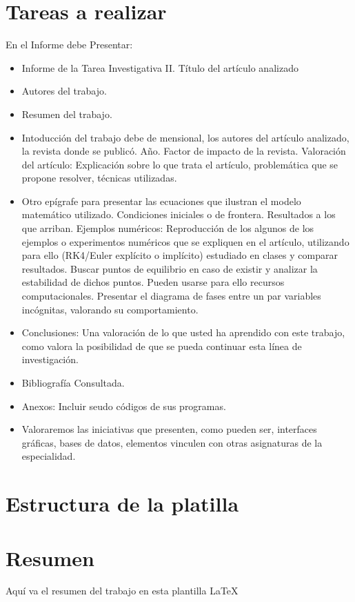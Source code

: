 \documentclass{wscpaperproc}
\theoremstyle{wsc}
\begin{document}
\maketitle
\section*{Tareas a realizar}
En el Informe debe Presentar:
\begin{itemize}
	\item Informe de la Tarea Investigativa II. T\'itulo del art\'iculo analizado
	\item Autores del trabajo.
	\item Resumen del trabajo.
	\item Intoducción del trabajo debe de mensional, los autores del art\'iculo analizado, la revista donde se publicó. A\~no. Factor de impacto de la revista. Valoración del art\'iculo: Explicación sobre lo que trata el art\'iculo, problemática que se propone resolver, t\'ecnicas utilizadas.
	\item Otro ep\'igrafe para presentar las ecuaciones que ilustran el modelo matemático utilizado. Condiciones iniciales o de frontera. Resultados a los que arriban. Ejemplos num\'ericos: Reproducción de los algunos de los ejemplos o experimentos num\'ericos que se expliquen en el art\'iculo, utilizando para ello (RK4/Euler expl\'icito o impl\'icito) estudiado en clases y comparar resultados. Buscar puntos de equilibrio en caso de existir y analizar la estabilidad de dichos puntos. Pueden usarse para ello recursos computacionales. Presentar el diagrama de fases entre un par variables incógnitas, valorando su comportamiento.
	\item Conclusiones: Una valoración de lo que usted ha aprendido con este trabajo, como valora la posibilidad de que se pueda continuar esta l\'inea de investigación.
	\item Bibliograf\'ia Consultada.
	\item  Anexos: Incluir seudo códigos de sus programas.
	\item Valoraremos las iniciativas que presenten, como pueden ser, interfaces gráficas, bases de datos, elementos  vinculen con otras asignaturas de la especialidad.
\end{itemize}

\section*{Estructura de la platilla}
\section*{Resumen}
Aqu\'i va el resumen del trabajo en esta plantilla  \LaTeX\
\end{document}
